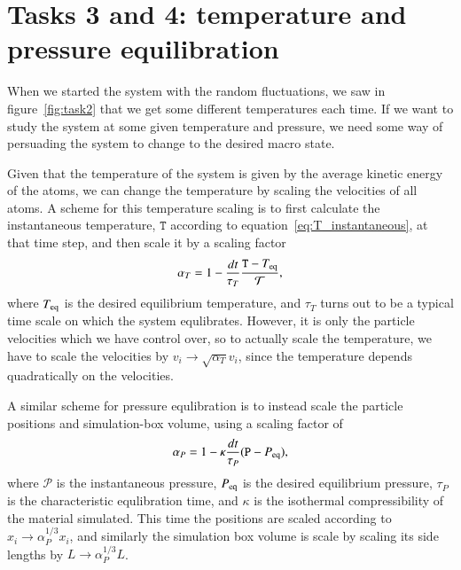\section*{Tasks 3 and 4: temperature and pressure equilibration}
When we started the system with the random fluctuations, we saw in figure~\ref{fig:task2} that we get some different temperatures each time. If we want to study the system at some given temperature and pressure, we need some way of persuading the system to change to the desired macro state.

Given that the temperature of the system is given by the average kinetic energy of the atoms, we can change the temperature by scaling the velocities of all atoms. A scheme for this temperature scaling is to first calculate the instantaneous temperature, $\mathtt{T}$ according to equation~\eqref{eq:T_instantaneous}, at that time step, and then scale it by a scaling factor
\begin{equation}
\alpha_T=1-\frac{dt}{\tau_T}\frac{\mathtt{T}-T_{\rm eq}}{\mathcal{T}},
\end{equation}
where $T_{\rm eq}$ is the desired equilibrium temperature, and $\tau_T$ turns out to be a typical time scale on which the system equlibrates. However, it is only the particle velocities which we have control over, so to actually scale the temperature, we have to scale the velocities by $v_i\to\sqrt{\alpha_T}v_i$, since the temperature depends quadratically on the velocities.

A similar scheme for pressure equlibration is to instead scale the particle positions and simulation-box volume, using a scaling factor of
\begin{equation}
\alpha_P=1-\kappa\frac{dt}{\tau_P}(\mathtt{P}-P_{\rm eq}),
\end{equation}
where $\mathcal{P}$ is the instantaneous pressure, $P_{\rm eq}$ is the desired equilibrium pressure, $\tau_P$ is the characteristic equlibration time, and $\kappa$ is the isothermal compressibility of the material simulated\footnotemark{}. This time the positions are scaled according to $x_i\to\alpha_P^{1/3}x_i$, and similarly the simulation box volume is scale by scaling its side lengths by $L\to\alpha_P^{1/3}L$.

